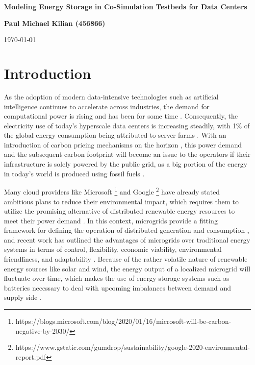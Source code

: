 \documentclass[11pt, a4paper]{report}
\begin{document}

\begin{center}
    \LARGE
    \vspace{2em}
    \textbf{Modeling Energy Storage in Co-Simulation Testbeds for Data Centers}

    \large
    \vspace{2em}
    \textbf{Paul Michael Kilian (456866)}

    \vspace{0.5em}
    \today
\end{center}

\section*{Introduction}
As the adoption of modern data-intensive technologies such as artificial intelligence continues to accelerate across industries, the demand for computational power is rising and has been for some time \cite{dhar2020carbon}. Consequently, the electricity use of today's hyperscale data centers is increasing steadily, with 1\% of the global energy consumption being attributed to server farms \cite{masanet2020recalibrating}. With an introduction of carbon pricing mechanisms on the horizon \cite{boyce2018carbon, best2020carbon}, this power demand and the subsequent carbon footprint will become an issue to the operators if their infrastructure is solely powered by the public grid, as a big portion of the energy in today's world is produced using fossil fuels \cite{SustainableEdgeComputing}.

Many cloud providers like Microsoft \footnote{https://blogs.microsoft.com/blog/2020/01/16/microsoft-will-be-carbon-negative-by-2030/} and Google \footnote{https://www.gstatic.com/gumdrop/sustainability/google-2020-environmental-report.pdf} have already stated ambitious plans to reduce their environmental impact, which requires them to utilize the promising alternative of distributed renewable energy resources to meet their power demand \cite{MicrogridReview}. In this context, microgrids provide a fitting framework for defining the operation of distributed generation and consumption \cite{Microgrid}, and recent work has outlined the advantages of microgrids over traditional energy systems in terms of control, flexibility, economic viability, environmental friendliness, and adaptability \cite{MicrogridPerspectives}. Because of the rather volatile nature of renewable energy sources like solar and wind, the energy output of a localized microgrid will fluctuate over time, which makes the use of energy storage systems such as batteries necessary to deal with upcoming imbalances between demand and supply side \cite{MicrogridStorageAdvances}.
\end{document}
